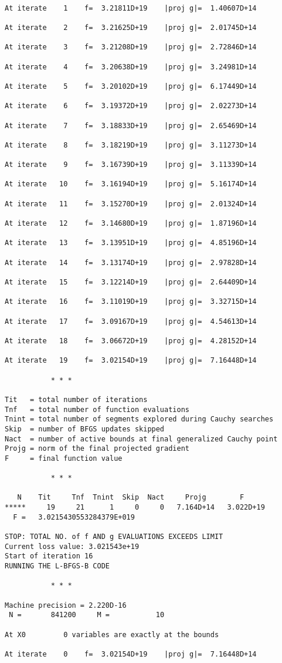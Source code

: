 \documentclass[11pt]{article}
\begin{document}
    \begin{Verbatim}[commandchars=\\\{\}]

At iterate    1    f=  3.21811D+19    |proj g|=  1.40607D+14

At iterate    2    f=  3.21625D+19    |proj g|=  2.01745D+14

At iterate    3    f=  3.21208D+19    |proj g|=  2.72846D+14

At iterate    4    f=  3.20638D+19    |proj g|=  3.24981D+14

At iterate    5    f=  3.20102D+19    |proj g|=  6.17449D+14

At iterate    6    f=  3.19372D+19    |proj g|=  2.02273D+14

At iterate    7    f=  3.18833D+19    |proj g|=  2.65469D+14

At iterate    8    f=  3.18219D+19    |proj g|=  3.11273D+14

At iterate    9    f=  3.16739D+19    |proj g|=  3.11339D+14

At iterate   10    f=  3.16194D+19    |proj g|=  5.16174D+14

At iterate   11    f=  3.15270D+19    |proj g|=  2.01324D+14

At iterate   12    f=  3.14680D+19    |proj g|=  1.87196D+14

At iterate   13    f=  3.13951D+19    |proj g|=  4.85196D+14

At iterate   14    f=  3.13174D+19    |proj g|=  2.97828D+14

At iterate   15    f=  3.12214D+19    |proj g|=  2.64409D+14

At iterate   16    f=  3.11019D+19    |proj g|=  3.32715D+14

At iterate   17    f=  3.09167D+19    |proj g|=  4.54613D+14

At iterate   18    f=  3.06672D+19    |proj g|=  4.28152D+14

At iterate   19    f=  3.02154D+19    |proj g|=  7.16448D+14

           * * *

Tit   = total number of iterations
Tnf   = total number of function evaluations
Tnint = total number of segments explored during Cauchy searches
Skip  = number of BFGS updates skipped
Nact  = number of active bounds at final generalized Cauchy point
Projg = norm of the final projected gradient
F     = final function value

           * * *

   N    Tit     Tnf  Tnint  Skip  Nact     Projg        F
*****     19     21      1     0     0   7.164D+14   3.022D+19
  F =   3.0215430553284379E+019

STOP: TOTAL NO. of f AND g EVALUATIONS EXCEEDS LIMIT
Current loss value: 3.021543e+19
Start of iteration 16
RUNNING THE L-BFGS-B CODE

           * * *

Machine precision = 2.220D-16
 N =       841200     M =           10

At X0         0 variables are exactly at the bounds

At iterate    0    f=  3.02154D+19    |proj g|=  7.16448D+14
    \end{Verbatim}
\end{document}

